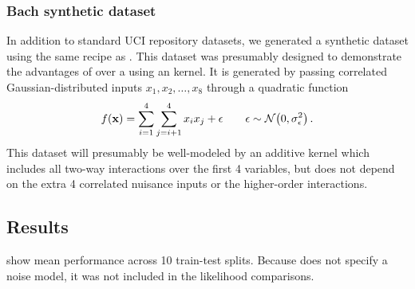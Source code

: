 \subsubsection{Bach synthetic dataset}
In addition to standard UCI repository datasets, we generated a synthetic dataset using the same recipe as \citet{Bach_HKL}.
This dataset was presumably designed to demonstrate the advantages of \HKL{} over a \gp{} using an \seard{} kernel.
It is generated by passing correlated Gaussian-distributed inputs $x_1, x_2, \dots, x_8$ through a quadratic function
%
\begin{align}
f({\bf{x}}) = \sum_{i=1}^4 \sum_{j=i+1}^4 x_i x_j + \epsilon \qquad \epsilon \sim \mathcal{N}\!\left(0,\sigma^2_\epsilon\right).
\end{align}
%
This dataset will presumably be well-modeled by an additive kernel which includes all two-way interactions over the first 4 variables, but does not depend on the extra 4 correlated nuisance inputs or the higher-order interactions.%

 
 
\subsection{Results}
 show mean performance across 10 train-test splits.
Because \HKL{} does not specify a noise model, it was not included in the likelihood comparisons.

